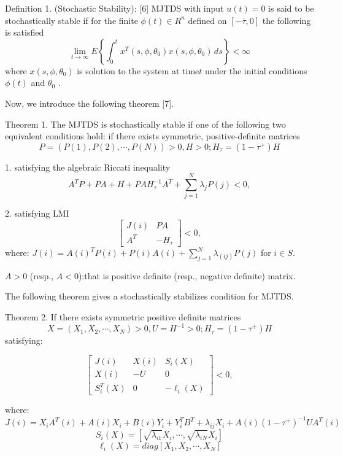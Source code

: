 \documentclass{vzmsthesis}
\begin{document}
Definition 1. (Stochastic Stability): [6] MJTDS with input $u(t)=0$ is said to be stochastically stable if for the finite $\phi(t)\in R^n$ defined on $[-\overline \tau,0]$ the following is satisfied
\begin{equation}
\lim_{t\to\infty} E\left\{\int_{0}^{t} x^T(s,\phi,\theta_0)x(s,\phi,\theta_0) \,ds\right\}<\infty 
\end{equation}
where $x(s,\phi,\theta_0)$ is solution to the system at time$t$ under the initial conditions $\phi(t)$  and $\theta_0 $ .

Now, we introduce the following theorem [7].

Theorem 1. The MJTDS is stochastically stable if one of the following two equivalent conditions hold:
if there exists symmetric, positive-definite matrices
\begin{equation}
P=(P(1),P(2),\cdots,P(N))>0 ,H>0; H_\tau =(1-\tau^+)H
\end{equation}

1. satisfying the algebraic Riccati inequality
\begin{equation}
A^TP+PA+H+PAH_\tau^{-1} A^T +\sum_{j=1}^{N}\lambda_jP(j)<0,
\end{equation}

2. satisfying LMI
\begin{equation}
\begin{bmatrix}
J(i) & PA\\
A^T & -H_\tau 
\end{bmatrix} <0,
\end{equation}
where:
 $J(i)=A(i)^TP(i)+P(i)A(i)+\sum_{j=1}^{N}\lambda_(ij)P(j)$ for $i \in S$.
 
$A>0$ (resp., $A<0$):that is positive definite (resp., negative definite) matrix.

The following theorem gives a stochastically stabilizes condition for MJTDS.

Theorem 2. If there exists symmetric positive definite matrices
$$X=(X_1,X_2,\cdots,X_N)>0 ,U=H^{-1}>0; H_\tau =(1-\tau^+)H$$ satisfying:

\begin{equation}
\begin{bmatrix}
J(i) & X(i) & S_i(X)\\
X(i) & -U & 0 \\
S_i^T(X) & 0 & -\ell_i(X) 
\end{bmatrix} <0,
\end{equation}

where:
$$J(i)=X_iA^T(i)+A(i)X_i+B(i)Y_i+Y_i^TB^T+\lambda_{ij}X_i+A(i)(1-\tau^+)^{-1}UA^T(i)$$
$$S_i(X)=[\sqrt{\lambda_{i1}}X_i,\cdots,\sqrt{\lambda_{iN}}X_i]$$
$$\ell_i(X)=diag[X_1,X_2,\cdots,X_N]$$
\end{document}
